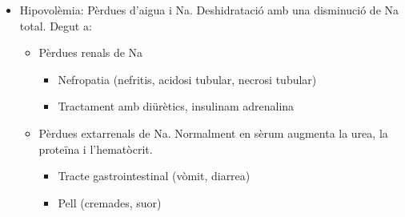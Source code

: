 \begin{enumerate}
\begin{itemize}
  \item Hipovolèmia: Pèrdues d'aigua i Na. Deshidratació amb una
    disminució de Na total. Degut a:
    \begin{itemize}
    \item Pèrdues renals de Na
      \begin{itemize}
      \item Nefropatia (nefritis, acidosi tubular, necrosi tubular)
      \item Tractament amb diürètics, insulinam adrenalina
      \end{itemize}
    \item Pèrdues extarrenals de Na. Normalment en sèrum augmenta la
      urea, la proteïna i l'hematòcrit.
      \begin{itemize}
      \item Tracte gastrointestinal (vòmit, diarrea)
      \item Pell (cremades, suor)
      \end{itemize}
    \end{itemize}
  \end{itemize}
\end{enumerate}

